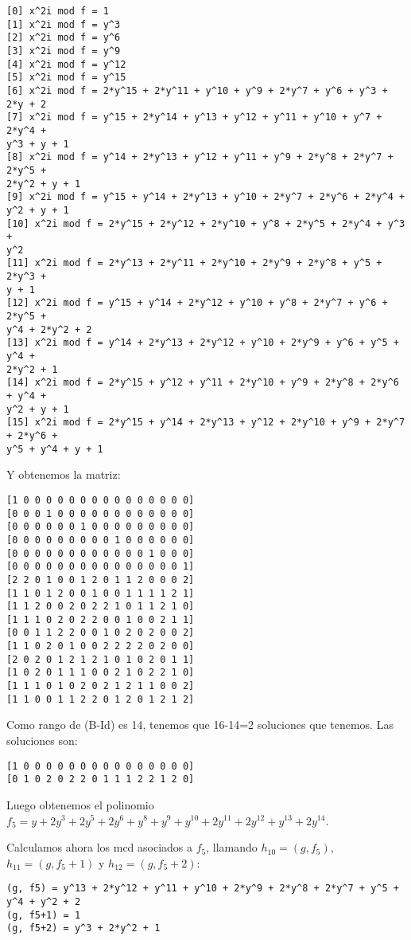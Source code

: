 \documentclass[a4paper]{article}
\begin{document}
\begin{verbatim}
[0] x^2i mod f = 1
[1] x^2i mod f = y^3
[2] x^2i mod f = y^6
[3] x^2i mod f = y^9
[4] x^2i mod f = y^12
[5] x^2i mod f = y^15
[6] x^2i mod f = 2*y^15 + 2*y^11 + y^10 + y^9 + 2*y^7 + y^6 + y^3 + 2*y + 2
[7] x^2i mod f = y^15 + 2*y^14 + y^13 + y^12 + y^11 + y^10 + y^7 + 2*y^4 + 
y^3 + y + 1
[8] x^2i mod f = y^14 + 2*y^13 + y^12 + y^11 + y^9 + 2*y^8 + 2*y^7 + 2*y^5 + 
2*y^2 + y + 1
[9] x^2i mod f = y^15 + y^14 + 2*y^13 + y^10 + 2*y^7 + 2*y^6 + 2*y^4 + 
y^2 + y + 1
[10] x^2i mod f = 2*y^15 + 2*y^12 + 2*y^10 + y^8 + 2*y^5 + 2*y^4 + y^3 + 
y^2
[11] x^2i mod f = 2*y^13 + 2*y^11 + 2*y^10 + 2*y^9 + 2*y^8 + y^5 + 2*y^3 + 
y + 1
[12] x^2i mod f = y^15 + y^14 + 2*y^12 + y^10 + y^8 + 2*y^7 + y^6 + 2*y^5 + 
y^4 + 2*y^2 + 2
[13] x^2i mod f = y^14 + 2*y^13 + 2*y^12 + y^10 + 2*y^9 + y^6 + y^5 + y^4 + 
2*y^2 + 1
[14] x^2i mod f = 2*y^15 + y^12 + y^11 + 2*y^10 + y^9 + 2*y^8 + 2*y^6 + y^4 + 
y^2 + y + 1
[15] x^2i mod f = 2*y^15 + y^14 + 2*y^13 + y^12 + 2*y^10 + y^9 + 2*y^7 + 2*y^6 + 
y^5 + y^4 + y + 1
\end{verbatim}

Y obtenemos la matriz:

\begin{verbatim}
[1 0 0 0 0 0 0 0 0 0 0 0 0 0 0 0]
[0 0 0 1 0 0 0 0 0 0 0 0 0 0 0 0]
[0 0 0 0 0 0 1 0 0 0 0 0 0 0 0 0]
[0 0 0 0 0 0 0 0 0 1 0 0 0 0 0 0]
[0 0 0 0 0 0 0 0 0 0 0 0 1 0 0 0]
[0 0 0 0 0 0 0 0 0 0 0 0 0 0 0 1]
[2 2 0 1 0 0 1 2 0 1 1 2 0 0 0 2]
[1 1 0 1 2 0 0 1 0 0 1 1 1 1 2 1]
[1 1 2 0 0 2 0 2 2 1 0 1 1 2 1 0]
[1 1 1 0 2 0 2 2 0 0 1 0 0 2 1 1]
[0 0 1 1 2 2 0 0 1 0 2 0 2 0 0 2]
[1 1 0 2 0 1 0 0 2 2 2 2 0 2 0 0]
[2 0 2 0 1 2 1 2 1 0 1 0 2 0 1 1]
[1 0 2 0 1 1 1 0 0 2 1 0 2 2 1 0]
[1 1 1 0 1 0 2 0 2 1 2 1 1 0 0 2]
[1 1 0 0 1 1 2 2 0 1 2 0 1 2 1 2]
\end{verbatim}

Como rango de (B-Id) es 14, tenemos que 16-14=2 soluciones que tenemos. Las soluciones son:

\begin{verbatim}
[1 0 0 0 0 0 0 0 0 0 0 0 0 0 0 0]
[0 1 0 2 0 2 2 0 1 1 1 2 2 1 2 0]
\end{verbatim}

Luego obtenemos el polinomio $f_5=y+2y^3+2y^5+2y^6+y^8+y^9+y^{10}+2y^{11}+2y^{12}+y^{13}+2y^{14}$.

Calculamos ahora los mcd asociados a $f_5$, llamando $h_{10}=(g, f_5)$, $h_{11}=(g, f_5+1)$ y $h_{12}=(g, f_5+2)$:

\begin{verbatim}
(g, f5) = y^13 + 2*y^12 + y^11 + y^10 + 2*y^9 + 2*y^8 + 2*y^7 + y^5 + y^4 + y^2 + 2
(g, f5+1) = 1
(g, f5+2) = y^3 + 2*y^2 + 1
\end{verbatim}
\end{document}

